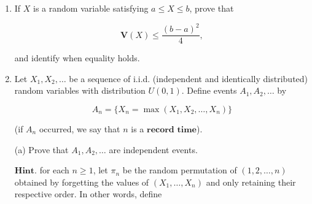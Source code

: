 \documentclass[11pt]{report}
\newcommand{\R}{\mathbb{R}}
\theoremstyle{plain}
\theoremstyle{definition}
\begin{document}
\begin{enumerate}[label=\arabic*.]
\[
\varphi(\alpha x + (1-\alpha)y) \le \alpha \varphi(x) + (1-\alpha) \varphi(y).
\]

(a) Prove that an equivalent condition for $\varphi$ to be convex is that for any $x<z<y$ in $(a,b)$ we have

\[
\frac{\varphi(z)-\varphi(x)}{z-x} \le \frac{\varphi(y)-\varphi(z)}{y-z}.
\]

Deduce using the mean value theorem that if $\varphi$ is twice continuously differentiable and satisfies $\varphi''\ge 0$ then it is convex.

(b) Prove $\textbf{Jensen's inequality}$, which says that if $X$ is a random variable such that $\mathrm{P}(X\in (a,b))=1$ and $\varphi:(a,b)\to\R$ is convex, then

\[
\varphi(\mathbf{E}X) \le \mathbf{E}(\varphi(X)).
\]

$\textbf{Hint.}$ Start by proving the following property of a convex function: If $\varphi$ is convex then at any point $x_0\in (a,b)$, $\varphi$ has a $\textbf{supporting line}$, that is, a linear function $y(x)=ax+b$ such that $y(x_0)=\varphi(x_0)$ and such that $\varphi(x)\ge y(x)$ for all $x\in(a,b)$ (to prove its existence, use the characterization of convexity from part (a) to show that the left-sided derivative of $\varphi$ at $x_0$ is less than or equal to the right-sided derivative at $x_0$; the supporting line is a line passing through the point $(x_0,\varphi(x_0))$ whose slope lies between these two numbers).
Now take the supporting line function at $x_0=\mathbf{E}X$ and see what happens.
\item If $X$ is a random variable satisfying $a\le X\le b$, prove that

\[
\mathbf{V}(X) \le \frac{(b-a)^2}{4},
\]

and identify when equality holds.
\item Let $X_1, X_2, \ldots$ be a sequence of i.i.d. (independent and identically distributed) random variables with distribution $U(0,1)$. Define events $A_1, A_2, \ldots$ by

\[
A_n = \{ X_n = \max(X_1,X_2,\ldots,X_n) \}
\]

(if $A_n$ occurred, we say that $n$ is a $\textbf{record time}$).

(a) Prove that $A_1,A_2,\ldots$ are independent events.

$\textbf{Hint.}$ for each $n\ge 1$, let $\pi_n$ be the random permutation of $(1,2,\ldots,n)$ obtained by forgetting the values of $(X_1,\ldots,X_n)$ and only retaining their respective order. In other words, define


\end{enumerate}
\end{document}

